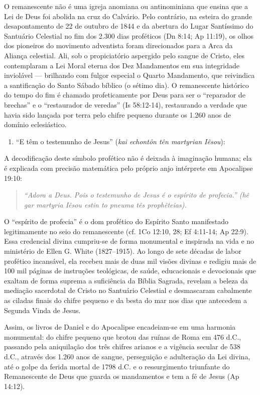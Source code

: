 O remanescente não é uma igreja anomiana ou antinominiana que ensina que a Lei de Deus foi abolida na cruz do Calvário. Pelo contrário, na esteira do grande desapontamento de 22 de outubro de 1844 e da abertura do Lugar Santíssimo do Santuário Celestial no fim dos 2.300 dias proféticos (Dn 8:14; Ap 11:19), os olhos dos pioneiros do movimento adventista foram direcionados para a Arca da Aliança celestial. Ali, sob o propiciatório aspergido pelo sangue de Cristo, eles contemplaram a Lei Moral eterna dos Dez Mandamentos em sua integridade inviolável — brilhando com fulgor especial o Quarto Mandamento, que reivindica a santificação do Santo Sábado bíblico (o sétimo dia). O remanescente histórico do tempo do fim é chamado profeticamente por Deus para ser o ``reparador de brechas'' e o ``restaurador de veredas'' (Is 58:12-14), restaurando a verdade que havia sido lançada por terra pelo chifre pequeno durante os 1.260 anos de domínio eclesiástico.

\begin{enumerate}
  \item ``E têm o testemunho de Jesus'' (\textit{kai echontôn tên martyrian Iêsou}):
\end{enumerate}

A decodificação deste símbolo profético não é deixada à imaginação humana; ela é explicada com precisão matemática pelo próprio anjo intérprete em Apocalipse 19:10:

\begin{quote}
\itshape ``Adora a Deus. Pois o testemunho de Jesus é o espírito de profecia.'' (\textit{hê gar martyria Iêsou estin to pneuma tês prophêteias}).
\end{quote}

O ``espírito de profecia'' é o dom profético do Espírito Santo manifestado legitimamente no seio do remanescente (cf. 1Co 12:10, 28; Ef 4:11-14; Ap 22:9). Essa credencial divina cumpriu-se de forma monumental e inspirada na vida e no ministério de Ellen G. White (1827–1915). Ao longo de sete décadas de labor profético incansável, ela recebeu mais de duas mil visões divinas e redigiu mais de 100 mil páginas de instruções teológicas, de saúde, educacionais e devocionais que exaltam de forma suprema a suficiência da Bíblia Sagrada, revelam a beleza da mediação sacerdotal de Cristo no Santuário Celestial e desmascaram cabalmente as ciladas finais do chifre pequeno e da besta do mar nos dias que antecedem a Segunda Vinda de Jesus.

Assim, os livros de Daniel e do Apocalipse encadeiam-se em uma harmonia monumental: do chifre pequeno que brotou das ruínas de Roma em 476 d.C., passando pela aniquilação dos três chifres arianos e a vigência secular de 538 d.C., através dos 1.260 anos de sangue, perseguição e adulteração da Lei divina, até o golpe da ferida mortal de 1798 d.C. e o ressurgimento triunfante do Remanescente de Deus que guarda os mandamentos e tem a fé de Jesus (Ap 14:12).

